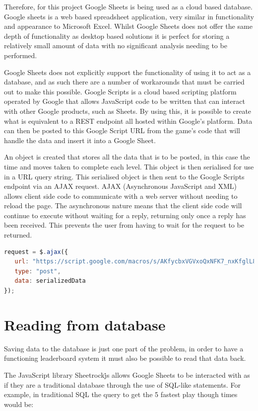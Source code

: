 \documentclass[12pt,a4paper]{report}
\begin{document}
Therefore, for this project Google Sheets is being used as a cloud based database. Google sheets is a web based spreadsheet application, very similar in functionality and appearance to Microsoft Excel. Whilst Google Sheets does not offer the same depth of functionality as desktop based solutions it is perfect for storing a relatively small amount of data with no significant analysis needing to be performed.

Google Sheets does not explicitly support the functionality of using it to act as a database, and as such there are a number of workarounds that must be carried out to make this possible.
Google Scripts is a cloud based scripting platform operated by Google that allows JavaScript code to be written that can interact with other Google products, such as Sheets. By using this, it is possible to create what is equivalent to a REST endpoint all hosted within Google's platform. 
Data can then be posted to this Google Script URL from the game's code that will handle the data and insert it into a Google Sheet.

An object is created that stores all the data that is to be posted, in this case the time and moves taken to complete each level. This object is then serialised for use in a URL query string. This serialised object is then sent to the Google Scripts endpoint via an AJAX request. AJAX (Asynchronous JavaScript and XML) allows client side code to communicate with a web server without needing to reload the page. The asynchronous nature means that the client side code will continue to execute without waiting for a reply, returning only once a reply has been received. This prevents the user from having to wait for the request to be returned.


\begin{lstlisting}[language=JavaScript]
request = $.ajax({
   url: "https://script.google.com/macros/s/AKfycbxVGVxoQxNFK7_nxKfglL8yLNUmdPwP2e9j8IMO6JY5wzLEdSE/exec",
   type: "post",
   data: serializedData
});
\end{lstlisting}

\section{Reading from database}
Saving data to the database is just one part of the problem, in order to have a functioning leaderboard system it must also be possible to read that data back.

The JavaScript library Sheetrock\.js allows Google Sheets to be interacted with as if they are a traditional database through the use of SQL-like statements.
For example, in traditional SQL the query to get the 5 fastest play though times would be:
\end{document}
